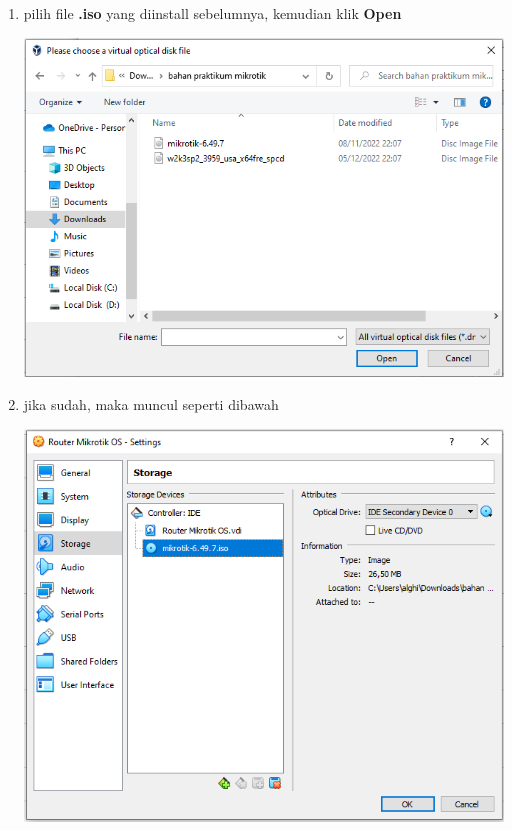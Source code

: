 \documentclass{article}
\begin{document}
\begin{flushleft}
\begin{enumerate}
			\item pilih file \textbf{.iso} yang diinstall sebelumnya, kemudian klik \textbf{Open}
				\begin{center}
					\includegraphics[scale=0.6]{(d)} 
				\end{center}
				
			\item jika sudah, maka muncul seperti dibawah 
				\begin{center}
					\includegraphics[scale=0.6]{(c.1)}
				\end{center}
			

\end{enumerate}
\end{flushleft}
\end{document}

